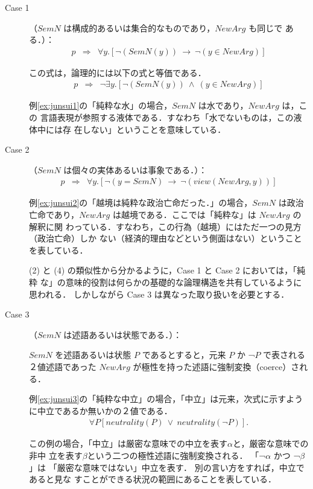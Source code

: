 \begin{description}

\item[Case 1] （$SemN$ は構成的あるいは集合的なものであり，$NewArg$ も同じで
  ある．）： 
  \begin{eqnarray}
    p & \Rightarrow & \forall y.[¬(SemN(y)) \ \rightarrow \ ¬(y \in NewArg)] 
  \end{eqnarray}

この式は，論理的には以下の式と等価である．
  \begin{eqnarray}
    p & \Rightarrow & ¬\exists y.[¬ (SemN(y)) \ \wedge \ (y \in NewArg)]
  \end{eqnarray}

例\ref{ex:junsui1}の「純粋な水」の場合，$SemN$ は水であり，$NewArg$ は，この
言語表現が参照する液体である．すなわち「水でないものは，この液体中には存
在しない」ということを意味している． 

\item[Case 2] （$SemN$ は個々の実体あるいは事象である．）：
  \begin{eqnarray}
     p & \Rightarrow & 
     \forall y.[¬(y = SemN) \ \rightarrow \ ¬ (view (NewArg, y))] 
  \end{eqnarray}

例\ref{ex:junsui2}の「越境は純粋な政治亡命だった．」の場合，$SemN$ は政治
亡命であり，$NewArg$ は越境である．ここでは「純粋な」は $NewArg$ の解釈に関
わっている．すなわち，この行為（越境）にはただ一つの見方（政治亡命）しか
ない（経済的理由などという側面はない）ということを表している． 

(2) と (4) の類似性から分かるように，Case 1 と Case 2 においては，「純粋 
な」の意味的役割は何らかの基礎的な論理構造を共有しているように思われる．
しかしながら Case 3 は異なった取り扱いを必要とする．

\item[Case 3]（$SemN$ は述語あるいは状態である．）：

$SemN$ を述語あるいは状態 $P$ であるとすると，元来 $P$ か ¬$P$ で表される
２値述語であった $NewArg$ が極性を持った述語に強制変換（coerce）される． 

例\ref{ex:junsui3}の「純粋な中立」の場合，「中立」は元来，次式に示すよう
に中立であるか無いかの２値である． 
\begin{eqnarray*}
\forall P [neutrality(P)\ \vee\ neutrality(¬P)].  
\end{eqnarray*}

この例の場合，「中立」は厳密な意味での中立を表す$\alpha$と，厳密な意味での非中
立を表す$\beta$という二つの極性述語に強制変換される．
「¬$\alpha$ かつ ¬$\beta$」は
「厳密な意味ではない」中立を表す． 別の言い方をすれば，中立であると見な
すことができる状況の範囲にあることを表している． 

\end{description}

